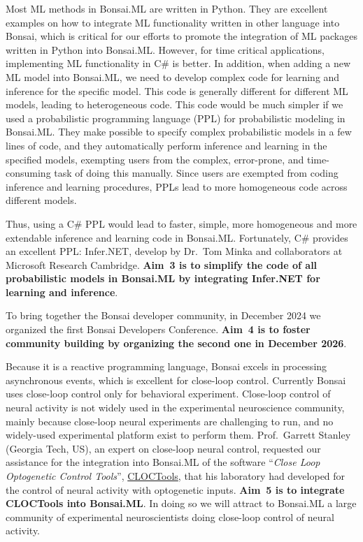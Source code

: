 Most ML methods in Bonsai.ML are written in Python. They are excellent examples
on how to integrate ML functionality written in other language into Bonsai,
which is critical for our efforts to promote the integration of ML packages
written in Python into Bonsai.ML.
%
However, for time critical applications, implementing ML functionality in C\#
is better.
%
In addition, when adding a new ML model into Bonsai.ML, we need to develop
complex code for learning and inference for the specific model. This code is
generally different for different ML models, leading to heterogeneous code.
%
This code would be much simpler if we used a probabilistic programming language
(PPL) for probabilistic modeling in Bonsai.ML. They make possible to specify
complex probabilistic models in a few lines of code, and they automatically
perform inference and learning in the specified models, exempting users from
the complex, error-prone, and time-consuming task of doing this manually.
%
Since users are exempted from coding inference and learning procedures, PPLs
lead to more homogeneous code across different models.

Thus, using a C\# PPL would lead to faster, simple, more homogeneous and more
extendable inference and learning code in Bonsai.ML.
%
Fortunately, C\# provides an excellent PPL: Infer.NET, develop by Dr.~Tom Minka
and collaborators at Microsoft Research Cambridge. \textbf{Aim~3 is to simplify the
code of all probabilistic models in Bonsai.ML by integrating Infer.NET for
learning and inference}.

To bring together the Bonsai developer community, in December 2024 we organized
the first Bonsai Developers Conference. \textbf{Aim~4 is to foster community building
by organizing the second one in December 2026}.

Because it is a reactive programming language, Bonsai excels in processing
asynchronous events, which is excellent for close-loop control. Currently
Bonsai uses close-loop control only for behavioral experiment.
%
Close-loop control of neural activity is not widely used in the experimental
neuroscience community, mainly because close-loop neural experiments are
challenging to run, and no widely-used experimental platform exist to perform
them.
%
Prof.~Garrett Stanley (Georgia Tech, US), an expert on close-loop neural
control, requested our assistance for the integration into Bonsai.ML of the
software ``\emph{Close Loop Optogenetic Control Tools}'',
\href{https://cloctools.github.io/}{CLOCTools}, that his laboratory had
developed for the control of neural activity with optogenetic inputs.
\textbf{Aim~5 is to integrate CLOCTools into Bonsai.ML}.
%
In doing so we will attract to Bonsai.ML a large community of experimental
neuroscientists doing close-loop control of neural activity.

